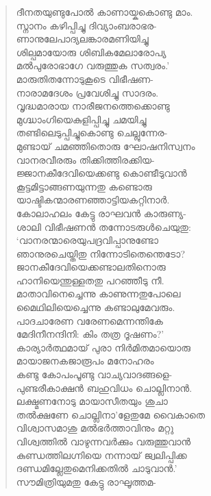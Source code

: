 \begin{verse}
ദീനതയുണ്ടുപോല്‍ കാണായ്കകൊണ്ടു മാം.\\
സ്നാനം കഴിപ്പിച്ചു ദിവ്യാംബരാഭര-\\
ണാനുലേപാദ്യലങ്കാരമണിയിച്ചു\\
ശില്പമായോരു ശിബികമേലാരോപ്യ\\
മല്‍പുരോഭാഗേ വരുത്തുക സത്വരം.’\\
മാരുതിതന്നോടുകൂടെ വിഭീഷണ-\\
നാരാമദേശം പ്രവേശിച്ചു സാദരം.\\
വൃദ്ധമാരായ നാരീജനത്തെക്കൊണ്ടു\\
മുഗ്ദ്ധാംഗിയെകുളിപ്പിച്ചു ചമയിച്ചു\\
തണ്ടിലെടുപ്പിച്ചുകൊണ്ടു ചെല്ലുന്നേര-\\
മുണ്ടായ് ചമഞ്ഞിതൊരു ഘോഷനിസ്വനം\\
വാനരവീരരും തിക്കിത്തിരക്കിയ-\\
ജ്ജാനകീദേവിയെക്കണ്ടു കൊണ്ടീടുവാന്‍\\
കൂട്ടമിട്ടാങ്ങണയുന്നതു കണ്ടൊരു\\
യാഷ്ടികന്മാരണഞ്ഞാട്ടിയകറ്റിനാര്‍.\\
കോലാഹലം കേട്ടു രാഘവന്‍ കാരുണ്യ-\\
ശാലി വിഭീഷണന്‍ തന്നോടരുള്‍ചെയുതു:\\
‘വാനരന്മാരെയുപദ്രവിപ്പാനുണ്ടോ\\
ഞാനുരചെയ്തിതു നിന്നോടിതെന്തെടോ?\\
ജാനകീദേവിയെക്കണ്ടാലതിനൊരു\\
ഹാനിയെന്തുള്ളതതു പറഞ്ഞീടു നീ.\\
മാതാവിനെച്ചെന്നു കാണുന്നതുപോലെ\\
മൈഥിലിയെച്ചെന്നു കണ്ടാലുമേവരും.\\
പാദചാരേണ വരേണമെന്നന്തികേ\\
മേദിനീനന്ദിനി: കിം തത്ര ദൂഷണം?’\\
കാര്യാര്‍ത്ഥമായ് പുരാ നിര്‍മിതമായൊരു\\
മായാജനകജാരൂപം മനോഹരം\\
കണ്ടു കോപംപൂണ്ടു വാച്യവാദങ്ങളെ-\\
പുണ്ടരീകാക്ഷന്‍ ബഹുവിധം ചൊല്ലിനാന്‍.\\
ലക്ഷ്മണനോടു മായാസീതയും ശുചാ\\
തല്‍ക്ഷണേ ചൊല്ലിനാ’ളേതുമേ വൈകാതെ\\
വിശ്വാസമാശു മല്‍ഭര്‍ത്താവിനും മറ്റു\\
വിശ്വത്തില്‍ വാഴുന്നവര്‍ക്കും വരുത്തുവാന്‍\\
കുണ്ഡത്തിലഗ്നിയെ നന്നായ് ജ്വലിപ്പിക്ക\\
ദണ്ഡമില്ലേതുമെനിക്കതില്‍ ചാടുവാന്‍.’\\
സൗമിത്രിയുമതു കേട്ടു രാഘൂത്തമ-\\

\end{verse}
